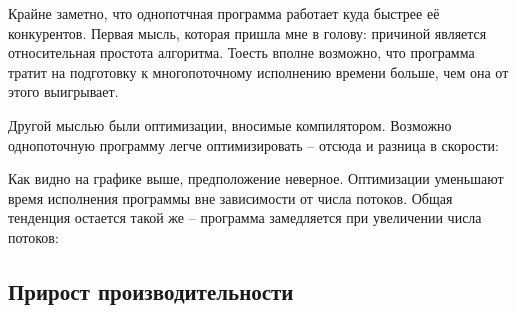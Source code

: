 \vspace{0.5cm}

Крайне заметно, что однопотчная программа работает куда быстрее её конкурентов.
Первая мысль, которая пришла мне в голову: причиной является относительная простота алгоритма.
Тоесть вполне возможно, что программа тратит на подготовку к многопоточному исполнению времени больше, чем она от этого выигрывает.

Другой мыслью были оптимизации, вносимые компилятором.
Возможно однопоточную программу легче оптимизировать -- отсюда и разница в скорости:

\vspace{0.5cm}


\vspace{0.5cm}

Как видно на графике выше, предположение неверное. 
Оптимизации уменьшают время исполнения программы вне зависимости от числа потоков.
Общая тенденция остается такой же -- программа замедляется при увеличении числа потоков:

\vspace{0.5cm}


\vspace{0.5cm}

\subsection{Прирост производительности}

